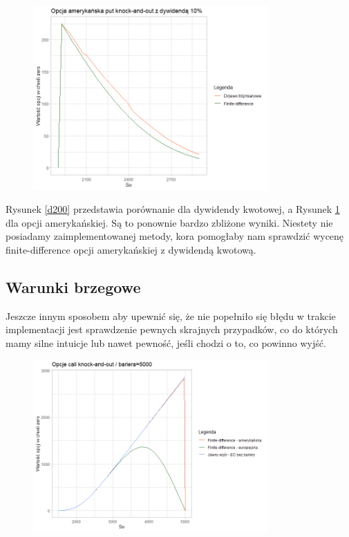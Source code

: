 \documentclass[12pt]{article}
\begin{document}
\begin{figure}[H]
    \centering
    \includegraphics[width=0.8\textwidth,height=\textheight,keepaspectratio]{ap_dyw10.png}
    \caption{}
    \label{adyw}
\end{figure}

Rysunek \ref{d200} przedstawia porównanie dla dywidendy kwotowej, a Rysunek \ref{adyw} dla opcji amerykańskiej. Są to ponownie bardzo zbliżone wyniki. Niestety nie posiadamy zaimplementowanej metody, kora pomogłaby nam sprawdzić wycenę finite-difference opcji amerykańskiej z dywidendą kwotową.

\subsection{Warunki brzegowe}
Jeszcze innym sposobem aby upewnić się, że nie popełniło się błędu w trakcie implementacji jest sprawdzenie pewnych skrajnych przypadków, co do których mamy silne intuicje lub nawet pewność, jeśli chodzi o to, co powinno wyjść. 

\begin{figure}[H]
    \centering
    \includegraphics[width=0.8\textwidth,height=\textheight,keepaspectratio]{bariera5000.png}
    \caption{}
    \label{b5000}
\end{figure}
\end{document}
